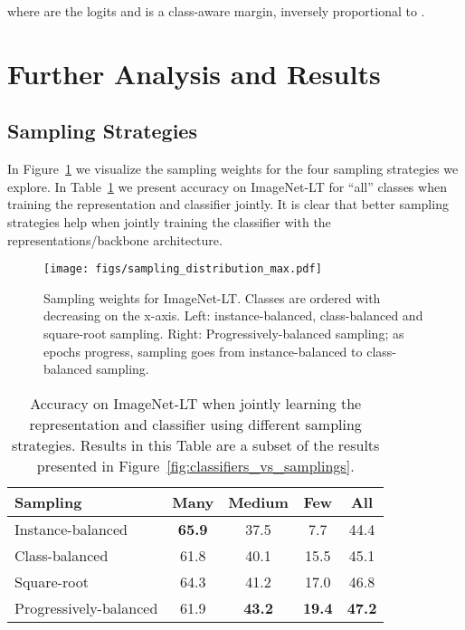 \documentclass[dvipsnames]{article} \usepackage{iclr2020_conference, times}
\newcommand{\uniform}{instance-balanced\xspace}
\newcommand{\Uniform}{Instance-balanced\xspace}
\newcommand{\balanced}{class-balanced\xspace}
\newcommand{\Balanced}{Class-balanced\xspace}
\newcommand{\squareroot}{square-root\xspace}
\newcommand{\Squareroot}{Square-root\xspace}
\newcommand{\Shift}{Progressively-balanced\xspace}
\begin{document}
where  are the logits and  is a class-aware margin, inversely proportional to .


\section{Further Analysis and Results}



\subsection{Sampling Strategies}


In Figure~\ref{fig:shifting} we visualize the sampling weights for the four sampling strategies we explore. In Table~\ref{tab:sampling} we present accuracy on ImageNet-LT for ``all'' classes when training the representation and classifier jointly. It is clear that better sampling strategies help when jointly training the classifier with the representations/backbone architecture. 


\begin{figure}[h]
    \centering
    \texttt{[image: figs/sampling\_distribution\_max.pdf]}
    \caption{Sampling weights  for ImageNet-LT. Classes are ordered with decreasing  on the x-axis. Left: \uniform, \balanced and \squareroot sampling. Right: \Shift sampling; as epochs progress, sampling goes from \uniform to \balanced sampling.}
    \label{fig:shifting}
\end{figure}



\begin{table}[h]
\small
\caption{Accuracy on ImageNet-LT when jointly learning the representation and classifier using different sampling strategies. Results in this Table are a subset of the results presented in Figure~\ref{fig:classifiers_vs_samplings}.}
\label{tab:sampling}
\begin{center}
\begin{tabular}{lcccc}
\toprule
Sampling & Many & Medium & Few & All \\
\midrule
\Uniform & \textbf{65.9} & 37.5 & 7.7 & 44.4 \\
 \Balanced &  61.8 & 40.1 & 15.5 & 45.1 \\
 \Squareroot & 64.3 & 41.2 & 17.0 & 46.8 \\
 \Shift & 61.9 & \textbf{43.2} & \textbf{19.4} & \textbf{47.2} \\
\bottomrule
\end{tabular}
\end{center}
\end{table}
\end{document}
